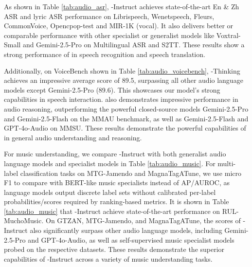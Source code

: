 As shown in Table \ref{tab:audio_asr}, \method-Instruct achieves state-of-the-art En \& Zh ASR and lyric ASR performance on Librispeech, Wenetspeech, Fleurs, CommonVoice, Opencpop-test and MIR-1K (vocal). It also delivers better or comparable performance with other specialist or generalist models like Voxtral-Small and Gemini-2.5-Pro on Multilingual ASR and S2TT. These results show a strong performance of \method in speech recognition and speech translation.

Additionally, on VoiceBench shown in Table \ref{tab:audio_voicebench}, \method-Thinking achieves an impressive average score of 89.5, surpassing all other audio language models except Gemini-2.5-Pro (89.6). This showcases our model's strong capabilities in speech interaction. \method also demonstrates impressive performance in audio reasoning, outperforming the powerful closed-source models Gemini-2.5-Pro and Gemini-2.5-Flash on the MMAU benchmark, as well as Gemini-2.5-Flash and GPT-4o-Audio on MMSU. These results demonstrate the powerful capabilities of \method in general audio understanding and reasoning.

% 

For music understanding, we compare \method-Instruct with both generalist audio language models and specialist models in Table \ref{tab:audio_music}. For multi-label classification tasks on MTG-Jamendo and MagnaTagATune, we use micro F1 to compare with BERT-like music specialists instead of AP/AUROC, as language models output discrete label sets without calibrated per-label probabilities/scores required by ranking-based metrics. It is shown in Table \ref{tab:audio_music} that \method-Instruct achieve state-of-the-art performance on RUL-MuchoMusic. On GTZAN, MTG-Jamendo, and MagnaTagATune, the scores of \method-Instruct also significantly surpass other audio language models, including Gemini-2.5-Pro and GPT-4o-Audio, as well as self-supervised music specialist models probed on the respective datasets. These results demonstrate the superior capabilities of \method-Instruct across a variety of music understanding tasks.





